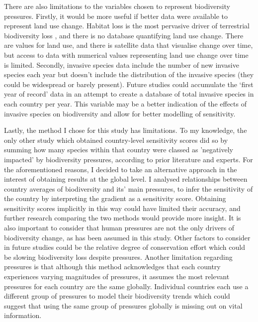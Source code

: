 \documentclass[11pt, a4paper, titlepage]{article}
\begin{document}
	There are also limitations to the variables chosen to represent biodiversity pressures. Firstly, it would be more useful if better data were available to represent land use change. Habitat loss is the most pervasive driver of terrestrial biodiversity loss \citep{mazor2018global}, and there is no database quantifying land use change. There are values for land use, and there is satellite data that visualise change over time, but access to data with numerical values representing land use change over time is limited. Secondly, invasive species data include the number of new invasive species each year but doesn't include the distribution of the invasive species (they could be widespread or barely present). Future studies could accumulate the `first year of record' data in an attempt to create a database of total invasive species in each country per year. This variable may be a better indication of the effects of invasive species on biodiversity and allow for better modelling of sensitivity.
	
	
     Lastly, the method I chose for this study has limitations. To my knowledge, the only other study which obtained country-level sensitivity scores  \citep{louette2010bioscore} did so by summing how many species within that country were classed as 'negatively impacted' by biodiversity pressures, according to prior literature and experts. For the aforementioned reasons, I decided to take an alternative approach in the interest of obtaining results at the global level. I analysed relationships between country averages of biodiversity and its' main pressures, to infer the sensitivity of the country by interpreting the gradient as a sensitivity score. Obtaining sensitivity scores implicitly in this way could have limited their accuracy, and further research comparing the two methods would provide more insight.	It is also important to consider that human pressures are not the only drivers of biodiversity change, as has been assumed in this study. Other factors to consider in future studies could be the relative degree of conservation effort which could be slowing biodiversity loss despite pressures. Another limitation regarding pressures is that although this method acknowledges that each country experiences varying magnitudes of pressures, it assumes the most relevant pressures for each country are the same globally. Individual countries each use a different group of pressures to model their biodiversity trends \citep{henly2021biodiversity} which could suggest that using the same group of pressures globally is missing out on vital information.
	
\end{document}
